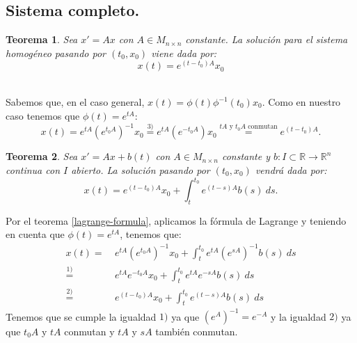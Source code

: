 \documentclass{article}
\makeatletter
\theoremstyle{theorem-style}  %
\newtheorem{theorem}{Teorema}[section]  %
\theoremstyle{definition-style}
\theoremstyle{example-style}
\renewenvironment{proof}[1][\proofname]{\par
	\pushQED{\qed}%
	\normalfont \topsep6\p@\@plus6\p@\relax
	\list{}{%
		\settowidth{\leftmargin}{\quad:\hskip\labelsep}%
		\setlength{\labelwidth}{0pt}%
		\setlength{\itemindent}{-\leftmargin}%
	}%
	\item[\hskip\labelsep\itshape#1\@addpunct{:}]\ignorespaces
}{%
	\popQED\endlist\@endpefalse
}
\makeatother
\begin{document}
\subsection{Sistema completo.}
\begin{theorem}
	Sea $x' = Ax$ con $A \in M_{n \times n}$ constante. La solución para el sistema homogéneo pasando por $(t_0, x_0)$ viene dada por:
	\[x(t) = e^{(t - t_0)A}x_0\]
\end{theorem}
\begin{proof}\ \\
	Sabemos que, en el caso general, $x(t) = \phi (t) \phi^{-1} (t_0) x_0$. Como en nuestro caso tenemos que $\phi (t) = e^{tA}$:
	\[x(t) = e^{tA}(e^{t_0A})^{-1}x_0 \stackrel{3)}{=} e^{tA}(e^{-t_0A})x_0 \stackrel{tA \text{ y } t_0A \text{ conmutan}}{=} e^{(t - t_0)A}.\]
\end{proof}
\begin{theorem}
	Sea $x' = Ax + b(t)$ con $A \in M_{n \times n}$ constante y $ b:I \subset \mathbb{R} \longrightarrow \mathbb{R}^n $	continua con $I$ abierto. La solución pasando por $(t_0, x_0)$ vendrá dada por:
	\[x(t) = e^{(t - t_0)A}x_0 + \int_{t}^{t_0}e^{(t - s)A}b(s) \ ds.\]
\end{theorem}
\begin{proof}
	Por el teorema \ref{lagrange-formula}, aplicamos la fórmula de Lagrange y teniendo en cuenta que $\phi (t) = e^{tA}$, tenemos que:
	\begin{align*}
	x(t) =& \ e^{tA}(e^{t_0A})^{-1}x_0 + \int_{t}^{t_0} e^{tA}(e^{sA})^{-1} b(s) \ ds  \\
	\stackrel{1)}{=}& \ e^{tA}e^{-t_0A}x_0 + \int_{t}^{t_0}e^{tA}e^{-sA} b(s) \ ds \\
	\stackrel{2)}{=}& \ e^{(t-t_0)A}x_0 + \int_{t}^{t_0}e^{(t-s)A} b(s) \ ds
	\end{align*}
	Tenemos que se cumple la igualdad $1)$ ya que $(e^A)^{-1} = e^{-A}$ y la igualdad $2)$ ya que $t_0A$ y $tA$ conmutan y $tA$ y $sA$ también conmutan.
\end{proof}
\end{document}
